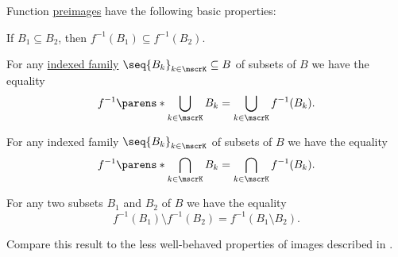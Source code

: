 \begin{proposition}\label{thm:function_preimage_properties}
  Function \hyperref[thm:function_properties/preimage]{preimages} have the following basic properties:
  \begin{thmenum}
     If \( B_1 \subseteq B_2 \), then \( f^{-1}(B_1) \subseteq f^{-1}(B_2) \).

     For any \hyperref[def:indexed_family]{indexed family} \( \seq{ B_k }_{k \in \mscrK} \subseteq B \) of subsets of \( B \) we have the equality
    \begin{equation}\label{eq:thm:function_preimage_properties/union}
      f^{-1}\parens*{ \bigcup_{k \in \mscrK} B_k } = \bigcup_{k \in \mscrK} f^{-1}(B_k).
    \end{equation}

     For any indexed family \( \seq{ B_k }_{k \in \mscrK} \) of subsets of \( B \) we have the equality
    \begin{equation}\label{eq:thm:function_preimage_properties/intersection}
      f^{-1}\parens*{ \bigcap_{k \in \mscrK} B_k } = \bigcap_{k \in \mscrK} f^{-1}(B_k).
    \end{equation}

     For any two subsets \( B_1 \) and \( B_2 \) of \( B \) we have the equality
    \begin{equation}\label{eq:thm:function_preimage_properties/difference}
      f^{-1}(B_1) \setminus f^{-1}(B_2) = f^{-1}(B_1 \setminus B_2).
    \end{equation}
  \end{thmenum}

  Compare this result to the less well-behaved properties of images described in .
\end{proposition}
